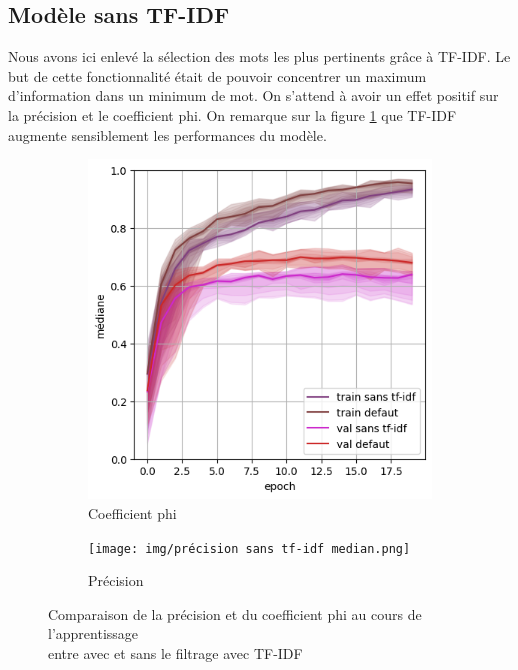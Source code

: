 \documentclass{article}
\begin{document}
\subsection{Modèle sans TF-IDF}
Nous avons ici enlevé la sélection des mots les plus pertinents grâce à TF-IDF. 
Le but de cette fonctionnalité était de pouvoir concentrer un maximum d'information dans un minimum de mot.
On s'attend à avoir un effet positif sur la précision et le coefficient phi.
On remarque sur la figure \ref{fig:modele_sans_TF-IDF} que TF-IDF augmente sensiblement les performances du modèle.

\begin{figure}[H]
    \centering
    \captionsetup{justification=centering}
    \begin{subfigure}{0.39\textwidth}
      \includegraphics[width=\textwidth]{img/coefficient phi sans tf-idf median.png}
      \centering
      \caption{Coefficient phi }
    \end{subfigure}
    \begin{subfigure}{0.39\textwidth}
      \texttt{[image: img/précision sans tf-idf median.png]}
      \centering
      \caption{Précision}
    \end{subfigure}
    \caption{
        Comparaison de la précision et du coefficient phi au cours de l'apprentissage\\
        entre avec et sans le filtrage avec TF-IDF
    }
    \label{fig:modele_sans_TF-IDF}
\end{figure}
\end{document}

